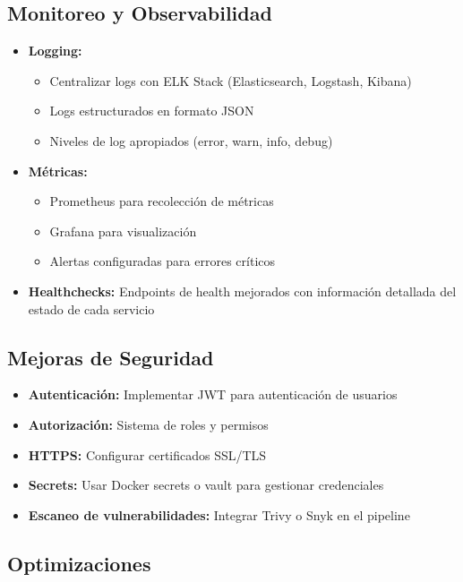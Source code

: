 \documentclass[12pt,a4paper]{article}
\begin{document}
\subsection{Monitoreo y Observabilidad}

\begin{itemize}
    \item \textbf{Logging:}
    \begin{itemize}
        \item Centralizar logs con ELK Stack (Elasticsearch, Logstash, Kibana)
        \item Logs estructurados en formato JSON
        \item Niveles de log apropiados (error, warn, info, debug)
    \end{itemize}
    
    \item \textbf{Métricas:}
    \begin{itemize}
        \item Prometheus para recolección de métricas
        \item Grafana para visualización
        \item Alertas configuradas para errores críticos
    \end{itemize}
    
    \item \textbf{Healthchecks:} Endpoints de health mejorados con información detallada del estado de cada servicio
\end{itemize}

\subsection{Mejoras de Seguridad}

\begin{itemize}
    \item \textbf{Autenticación:} Implementar JWT para autenticación de usuarios
    \item \textbf{Autorización:} Sistema de roles y permisos
    \item \textbf{HTTPS:} Configurar certificados SSL/TLS
    \item \textbf{Secrets:} Usar Docker secrets o vault para gestionar credenciales
    \item \textbf{Escaneo de vulnerabilidades:} Integrar Trivy o Snyk en el pipeline
\end{itemize}

\subsection{Optimizaciones}
\end{document}

